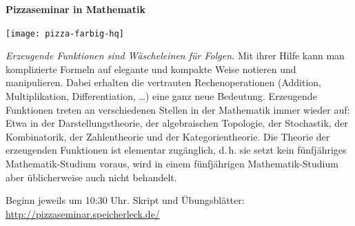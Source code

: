 \documentclass[a4paper,ngerman,landscape,12pt]{scrartcl}
\begin{document}
\begin{center}
  \Huge
  \textbf{\sf Pizzaseminar in Mathematik}

  \texttt{[image: pizza-farbig-hq]}

  \vspace{1em}
  \large
  \begin{minipage}{0.95\textwidth}
    \setlength\parskip{\medskipamount}
    \setlength\columnsep{1.5cm}
    \begin{multicols}{2}
\emph{Erzeugende Funktionen sind Wäscheleinen für Folgen.}
Mit ihrer Hilfe kann man komplizierte Formeln auf elegante und kompakte
Weise notieren und manipulieren. Dabei erhalten die vertrauten
Rechenoperationen (Addition, Multiplikation, Differentiation,
\ldots) eine ganz neue Bedeutung.
Erzeugende Funktionen treten an verschiedenen Stellen in
der Mathematik immer wieder auf: Etwa in der Darstellungstheorie, der
algebraischen Topologie, der Stochastik, der Kombinatorik, der
Zahlentheorie und der
Kategorientheorie. Die Theorie der erzeugenden
Funktionen ist elementar
zugänglich, d.\,h. sie setzt kein
fünfjähriges Mathematik-Studium voraus,
wird in einem
fünfjährigen Mathematik-Studium aber
üblicherweise auch nicht behandelt.

Beginn jeweils um 10:30 Uhr. Skript und Übungsblätter: \\
\url{http://pizzaseminar.speicherleck.de/}
\end{multicols}
\newpage
  \end{minipage}


\end{center}
\end{document}
